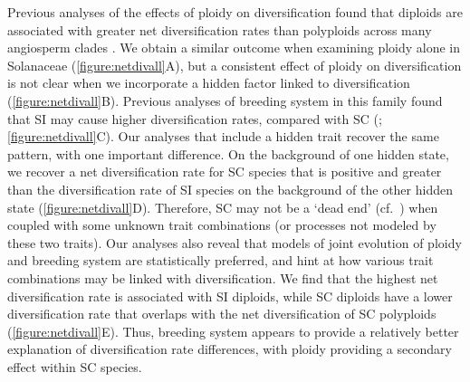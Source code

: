 Previous analyses of the effects of ploidy on diversification found that diploids are associated with greater net diversification rates than polyploids across many angiosperm clades \citep{mayrose_2011, mayrose_2015}. 
We obtain a similar outcome when examining ploidy alone in Solanaceae (\cref{figure:netdivall}A), but a consistent effect of ploidy on diversification is not clear when we incorporate a hidden factor linked to diversification (\cref{figure:netdivall}B).
%
Previous analyses of breeding system in this family found that SI may cause higher diversification rates, compared with SC (\citealt{goldberg_2010}; \cref{figure:netdivall}C).
Our analyses that include a hidden trait recover the same pattern, with one important difference.
On the background of one hidden state, we recover a net diversification rate for SC species that is positive and greater than the diversification rate of SI species on the background of the other hidden state (\cref{figure:netdivall}D).%
Therefore, SC may not be a `dead end' (cf.\ \citealt{igic_2013}) when coupled with some unknown trait combinations (or processes not modeled by these two traits). 
%
Our analyses also reveal that models of joint evolution of ploidy and breeding system are statistically preferred, and hint at how various trait combinations may be linked with diversification.
We find that the highest net diversification rate is associated with SI diploids, while SC diploids have a lower diversification rate that overlaps with the net diversification of SC polyploids (\cref{figure:netdivall}E).
Thus, breeding system appears to provide a relatively better explanation of diversification rate differences, with ploidy providing a secondary effect within SC species.

